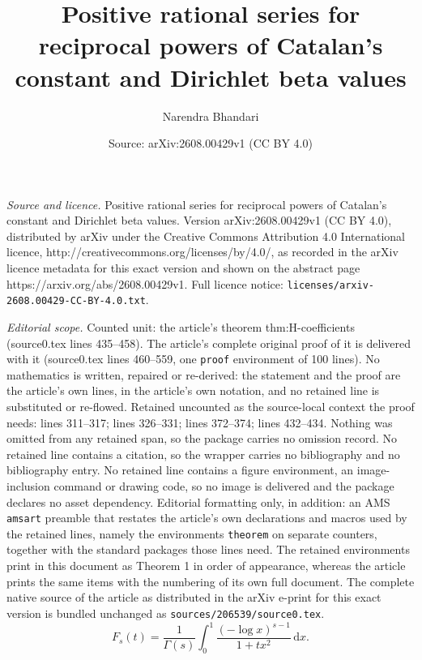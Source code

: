 \documentclass[10pt,a4paper]{amsart}
\title{Positive rational series for reciprocal powers of Catalan's constant and Dirichlet beta values}
\author{Narendra Bhandari}
\date{Source: arXiv:2608.00429v1 (CC BY 4.0)}
\newcommand{\dd}{\,\mathrm{d}}
\begin{document}
\maketitle

\noindent\emph{Source and licence.} Positive rational series for reciprocal powers of Catalan's constant and Dirichlet beta values. Version arXiv:2608.00429v1 (CC BY 4.0), distributed by arXiv under the Creative Commons Attribution 4.0 International licence, http://creativecommons.org/licenses/by/4.0/, as recorded in the arXiv licence metadata for this exact version and shown on the abstract page https://arxiv.org/abs/2608.00429v1. Full licence notice: \texttt{licenses/arxiv-2608.00429-CC-BY-4.0.txt}.\par\smallskip

\noindent\textit{Editorial scope.} Counted unit: the article's theorem thm:H-coefficients (source0.tex lines 435--458). The article's complete original proof of it is delivered with it (source0.tex lines 460--559, one \texttt{proof} environment of 100 lines). No mathematics is written, repaired or re-derived: the statement and the proof are the article's own lines, in the article's own notation, and no retained line is substituted or re-flowed.  Retained uncounted as the source-local context the proof needs: lines 311--317; lines 326--331; lines 372--374; lines 432--434.  Nothing was omitted from any retained span, so the package carries no omission record.  No retained line contains a citation, so the wrapper carries no bibliography and no bibliography entry.  No retained line contains a figure environment, an image-inclusion command or drawing code, so no image is delivered and the package declares no asset dependency.  Editorial formatting only, in addition: an AMS \texttt{amsart} preamble that restates the article's own declarations and macros used by the retained lines, namely the environments \texttt{theorem} on separate counters, together with the standard packages those lines need.  The retained environments print in this document as Theorem 1 in order of appearance, whereas the article prints the same items with the numbering of its own full document.  The complete native source of the article as distributed in the arXiv e-print for this exact version is bundled unchanged as \texttt{sources/206539/source0.tex}.
\begin{equation}\label{eq:F-integral}
 F_s(t)
 =
 \frac1{\Gamma(s)}
 \int_0^1
 \frac{(-\log x)^{s-1}}{1+tx^2}\dd x.
\end{equation}
\end{document}
